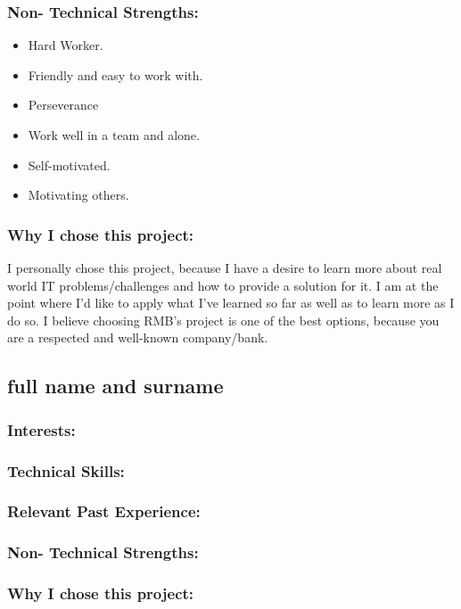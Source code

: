 \subsubsection{Non- Technical Strengths:}
	\begin{itemize}
		\item Hard Worker.
		\item Friendly and easy to work with.
		\item Perseverance
		\item Work well in a team and alone.
		\item Self-motivated.
		\item Motivating others.
	\end{itemize}

\subsubsection{Why I chose this project:}
	\par{I personally chose this project, because I have a desire to learn more about real world IT problems/challenges and how to provide a solution for it. I am at the point where I'd like to apply what I've learned so far as well as to learn more as I do so. I believe choosing RMB's project is one of the best options, because you are a respected and well-known company/bank.}

\newpage
\subsection{full name and surname}

\subsubsection{Interests:}

\subsubsection{Technical Skills:}

\subsubsection{Relevant Past Experience:}

\subsubsection{Non- Technical Strengths:}

\subsubsection{Why I chose this project:}

\newpage